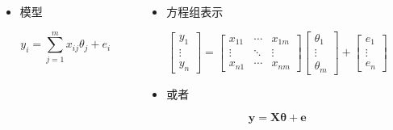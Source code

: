 \documentclass[serif,aspectratio=169]{beamer}
\begin{document}
\begin{frame}
  \begin{columns}
    \begin{column}{.4\textwidth}
      \begin{itemize}
      \item 模型
      \end{itemize}
      $$y_i = \sum_{j=1}^{m}x_{ij}\theta_j+e_i$$
    \end{column}
    \pause
    \begin{column}{.6\textwidth}
      \begin{itemize}
      \item 方程组表示
      \end{itemize}
      $$
      \left[\begin{array}{c}
          y_1\\
          \vdots\\
          y_n
        \end{array}\right]
      =
      \left[\begin{array}{ccc}
          x_{11} & \cdots & x_{1m}\\
          \vdots & \ddots & \vdots\\
          x_{n1} & \cdots & x_{nm}
        \end{array}\right]
      \left[\begin{array}{c}
          \theta_1\\
          \vdots\\
          \theta_m
        \end{array}\right]
      +
      \left[\begin{array}{c}
          e_1\\
          \vdots\\
          e_n
        \end{array}\right]
      $$
      
      \begin{itemize}
      \item 或者
      \end{itemize}
      $$\mathbf{y=X\theta+e}$$
    \end{column}
  \end{columns}
\end{frame}
\end{document}
